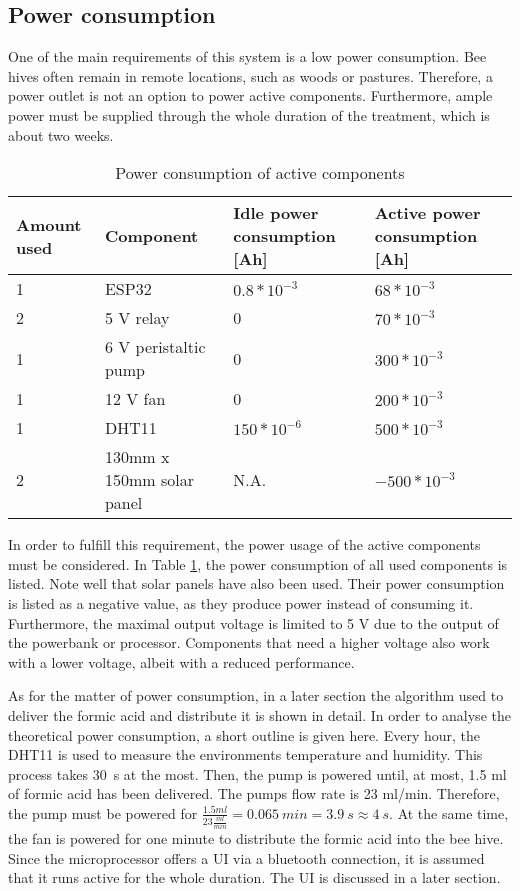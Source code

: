 
\subsection{Power consumption}\label{subsec:power-consumption}

One of the main requirements of this system is a low power consumption.
Bee hives often remain in remote locations, such as woods or pastures.
Therefore, a power outlet is not an option to power active components.
Furthermore, ample power must be supplied through the whole duration of the treatment, which is about two weeks.

\newpage

\begin{table}
    \centering
    \caption{Power consumption of active components}
    \label{tab:power-consumption-of-active-components}
    \renewcommand{\arraystretch}{1.2}
    \begin{tabular}{l|l|l|l}
        Amount used & Component & Idle power consumption [Ah] & Active power consumption [Ah] \\
        \hline
        1 & ESP32 &  $0.8 * 10^{-3}$ & $68 * 10^{-3}$ \\
        2 & 5 V relay & 0 & $70 * 10^{-3}$ \\
        1 & 6 V peristaltic pump & 0 & $300 * 10^{-3}$ \\
        1 & 12 V fan & 0 & $200 * 10^{-3} $ \\
        1 & DHT11 & $150 * 10^{-6}$ & $500 * 10^{-3}$ \\
        2 & 130mm x 150mm solar panel & N.A. & $- 500 * 10^{-3}$
    \end{tabular}
\end{table}

In order to fulfill this requirement, the power usage of the active components must be considered.
In Table \ref{tab:power-consumption-of-active-components}, the power consumption of all used components is listed.
Note well that solar panels have also been used.
Their power consumption is listed as a negative value, as they produce power instead of consuming it.
Furthermore, the maximal output voltage is limited to 5 V due to the output of the powerbank or processor.
Components that need a higher voltage also work with a lower voltage, albeit with a reduced performance.

As for the matter of power consumption, in a later section the algorithm used to deliver the formic acid and distribute it is shown in detail. %
In order to analyse the theoretical power consumption, a short outline is given here.
Every hour, the DHT11 is used to measure the environments temperature and humidity.
This process takes 30\ s at the most.
Then, the pump is powered until, at most, 1.5 ml of formic acid has been delivered.
The pumps flow rate is 23 ml/min.
Therefore, the pump must be powered for $\frac{1.5 ml}{23 \frac{ml}{min}} = 0.065\ min = 3.9\ s \approx 4\ s$.
At the same time, the fan is powered for one minute to distribute the formic acid into the bee hive.
Since the microprocessor offers a UI via a bluetooth connection, it is assumed that it runs active for the whole duration.
The UI is discussed in a later section. %

